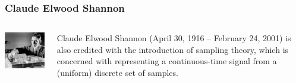 \documentclass{beamer}
\begin{document}
\begin{frame}
\frametitle{Claude Elwood Shannon}
\label{sec-2-11}
\begin{columns}
\begin{column}{0.3\textwidth}
\label{sec-2-11-1}

   \includegraphics[width=.9\linewidth]{image/Shannonmouse.PNG}
\end{column}
\begin{column}{0.7\textwidth}
\label{sec-2-11-2}


   Claude Elwood Shannon (April 30, 1916 – February 24, 2001) is also credited with the introduction of sampling theory, which is concerned with representing a continuous-time signal from a (uniform) discrete set of samples. 
\end{column}
\end{columns}
\end{frame}
\end{document}

